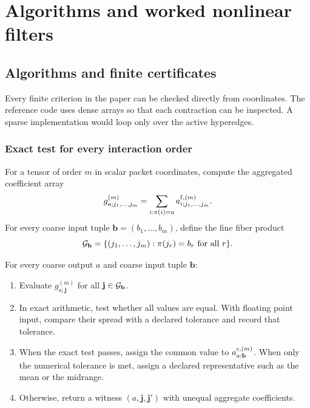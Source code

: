 \chapter{Algorithms and worked nonlinear filters}\label{PRIQ:book:chapter-44}
\section{Algorithms and finite certificates}\label{PRIQ:sec:algorithms}


\newcommand{\VerificationPassCount}{35}
\newcommand{\VerificationFailCount}{0}
\newcommand{\ExactPredictionResidual}{\ensuremath{7.22\times 10^{-16}}}
\newcommand{\ExactPosteriorResidual}{\ensuremath{3.89\times 10^{-16}}}
\newcommand{\ExactEvidenceResidual}{\ensuremath{6.66\times 10^{-16}}}
\newcommand{\PerturbationSlope}{\ensuremath{0.9999}}
\newcommand{\HyperedgeEntropyValue}{\ensuremath{1.9360}}
\newcommand{\EffectiveHyperedgeCount}{\ensuremath{6.931}}



Every finite criterion in the paper can be checked directly from coordinates.  The reference code uses dense arrays so that each contraction can be inspected.  A sparse implementation would loop only over the active hyperedges.

\subsection{Exact test for every interaction order}
For a tensor of order $m$ in scalar packet coordinates, compute the aggregated coefficient array
\[
  g^{(m)}_{a;j_1,\ldots,j_m}
  =
  \sum_{i:\pi(i)=a}
  a^{\mathrm f,(m)}_{i;j_1,\ldots,j_m}.
\]
For every coarse input tuple $\mathbf b=(b_1,\ldots,b_m)$, define the fine fiber product
\[
  \mathcal G_{\mathbf b}
  =
  \{(j_1,\ldots,j_m):\pi(j_r)=b_r\text{ for all }r\}.
\]

\begin{PRIQalgorithm}\label{PRIQ:alg:exact-lumpability}
For every coarse output $a$ and coarse input tuple $\mathbf b$:
\begin{enumerate}[label=\arabic*.,leftmargin=2.3em]
\item Evaluate $g^{(m)}_{a;\mathbf j}$ for all $\mathbf j\in\mathcal G_{\mathbf b}$.
\item In exact arithmetic, test whether all values are equal.  With floating point input, compare their spread with a declared tolerance and record that tolerance.
\item When the exact test passes, assign the common value to $a^{\mathrm c,(m)}_{a;\mathbf b}$.  When only the numerical tolerance is met, assign a declared representative such as the mean or the midrange.
\item Otherwise, return a witness $(a,\mathbf j,\mathbf j')$ with unequal aggregate coefficients.
\end{enumerate}
\end{PRIQalgorithm}

